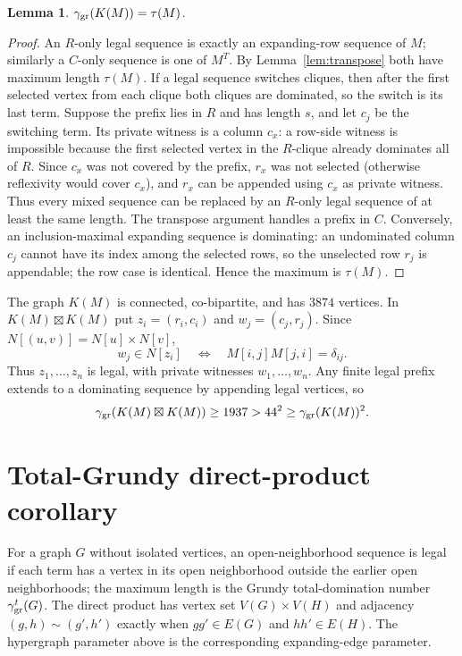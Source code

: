 \documentclass[11pt]{article}
\newtheorem{lemma}[theorem]{Lemma}
\newcommand{\gr}{\gamma_{\rm gr}}
\newcommand{\grt}{\gamma_{\rm gr}^{t}}
\begin{document}
\begin{lemma}\label{lem:K}
\(\gr(K(M))=\tau(M)\).
\end{lemma}
\begin{proof}
An $R$-only legal sequence is exactly an expanding-row sequence of $M$;
similarly a $C$-only sequence is one of $M^T$.  By Lemma~\ref{lem:transpose}
both have maximum length $\tau(M)$.  If a legal sequence switches cliques,
then after the first selected vertex from each clique both cliques are
dominated, so the switch is its last term.  Suppose the prefix lies in $R$
and has length $s$, and let $c_j$ be the switching term.  Its private witness
is a column $c_x$: a row-side witness is impossible because the first selected
vertex in the $R$-clique already dominates all of $R$.  Since $c_x$ was not
covered by the prefix, $r_x$ was not selected (otherwise reflexivity would
cover $c_x$), and $r_x$ can be appended using $c_x$ as private witness.  Thus
every mixed sequence can be replaced by an $R$-only legal sequence of at least
the same length.  The transpose argument handles a prefix in $C$.  Conversely,
an inclusion-maximal expanding sequence is dominating: an undominated column
$c_j$ cannot have its index among the selected rows, so the unselected row
$r_j$ is appendable; the row case is identical.  Hence the maximum is
$\tau(M)$.
\end{proof}

The graph $K(M)$ is connected, co-bipartite, and has $3874$ vertices.  In
$K(M)\boxtimes K(M)$ put $z_i=(r_i,c_i)$ and $w_j=(c_j,r_j)$.  Since
$N[(u,v)]=N[u]\times N[v]$,
\[
w_j\in N[z_i]\quad\Longleftrightarrow\quad M[i,j]M[j,i]=\delta_{ij}.
\]
Thus $z_1,\ldots,z_n$ is legal, with private witnesses $w_1,\ldots,w_n$.
Any finite legal prefix extends to a dominating sequence by appending legal
vertices, so
\[
\gr(K(M)\boxtimes K(M))\ge1937>44^2\ge\gr(K(M))^2.
\]

\section{Total-Grundy direct-product corollary}

For a graph $G$ without isolated vertices, an open-neighborhood sequence is
legal if each term has a vertex in its open neighborhood outside the earlier
open neighborhoods; the maximum length is the Grundy total-domination number
$\grt(G)$.  The direct product has vertex set $V(G)\times V(H)$ and adjacency
$(g,h)\sim(g',h')$ exactly when $gg'\in E(G)$ and $hh'\in E(H)$.  The
hypergraph parameter above is the corresponding expanding-edge parameter.
\end{document}
